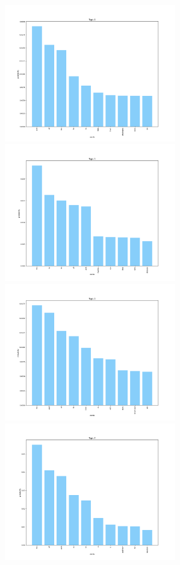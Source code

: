 \documentclass[10pt]{article} %
\begin{document}
\begin{center}
		\includegraphics[width=7.5cm]{images/plots/test_5/topic_4.png}
		\includegraphics[width=7.5cm]{images/plots/test_5/topic_5.png}
		\includegraphics[width=7.5cm]{images/plots/test_5/topic_6.png}
		\includegraphics[width=7.5cm]{images/plots/test_5/topic_7.png}
	\end{center}
\end{document}
